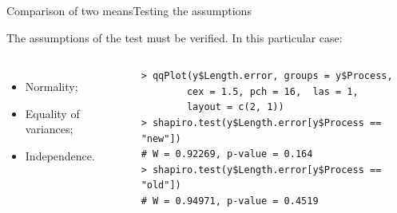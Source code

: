 \begin{frame}[fragile]{Comparison of two means}{Testing the assumptions}

The assumptions of the test must be verified. In this particular case:

\begin{columns}[T]

  {\smaller
\begin{itemize}
  \item \alert{Normality};
  \item Equality of variances;
  \item Independence.
\end{itemize}

{\smaller
\begin{verbatim}
> qqPlot(y$Length.error, groups = y$Process,
        cex = 1.5, pch = 16,  las = 1,
        layout = c(2, 1))
> shapiro.test(y$Length.error[y$Process == "new"])
# W = 0.92269, p-value = 0.164
> shapiro.test(y$Length.error[y$Process == "old"])
# W = 0.94971, p-value = 0.4519
\end{verbatim}}}


\end{columns}
\end{frame}
